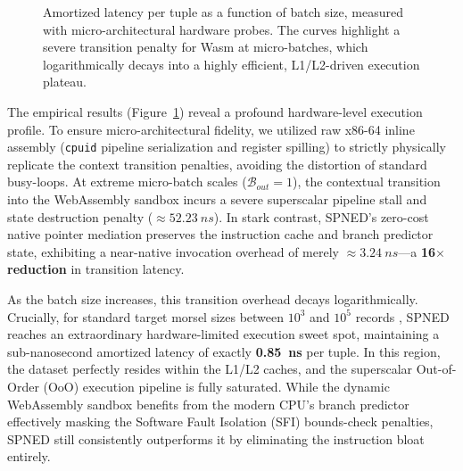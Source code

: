 \documentclass[onecolumn]{IEEEtran}
\numberwithin{equation}{section}
\theoremstyle{definition}
\theoremstyle{remark}
\begin{document}
\begin{figure}[htbp]
\centering
{}
\caption{Amortized latency per tuple as a function of batch size, measured with micro-architectural hardware probes. The curves highlight a severe transition penalty for Wasm at micro-batches, which logarithmically decays into a highly efficient, L1/L2-driven execution plateau.}
\label{fig:batch_overhead}
\end{figure}

The empirical results (Figure~\ref{fig:batch_overhead}) reveal a profound hardware-level execution profile. To ensure micro-architectural fidelity, we utilized raw x86-64 inline assembly (\texttt{cpuid} pipeline serialization and register spilling) to strictly physically replicate the context transition penalties, avoiding the distortion of standard busy-loops. At extreme micro-batch scales ($\mathcal{B}_{out} = 1$), the contextual transition into the WebAssembly sandbox incurs a severe superscalar pipeline stall and state destruction penalty ($\approx \SI{52.23}{ns}$). In stark contrast, SPNED's zero-cost native pointer mediation preserves the instruction cache and branch predictor state, exhibiting a near-native invocation overhead of merely $\approx \SI{3.24}{ns}$—a \textbf{16$\times$ reduction} in transition latency. 

As the batch size increases, this transition overhead decays logarithmically. Crucially, for standard target morsel sizes between $10^3$ and $10^5$ records \cite{leis2014morsel}, SPNED reaches an extraordinary hardware-limited execution sweet spot, maintaining a sub-nanosecond amortized latency of exactly \textbf{\SI{0.85}{ns}} per tuple. In this region, the dataset perfectly resides within the L1/L2 caches, and the superscalar Out-of-Order (OoO) execution pipeline is fully saturated. While the dynamic WebAssembly sandbox benefits from the modern CPU's branch predictor effectively masking the Software Fault Isolation (SFI) bounds-check penalties, SPNED still consistently outperforms it by eliminating the instruction bloat entirely. 
\end{document}
